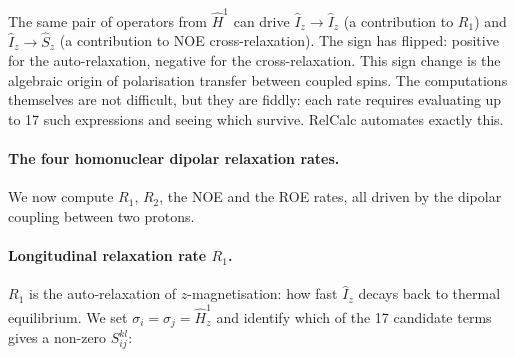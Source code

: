 \documentclass[notitlepage,11pt]{article}
\begin{document}
The same pair of operators from $\hat{H}^1$ can drive $\hat{I}_z\to\hat{I}_z$ (a contribution to $R_1$) and $\hat{I}_z\to\hat{S}_z$ (a contribution to NOE cross-relaxation). The sign has flipped: positive for the auto-relaxation, negative for the cross-relaxation. This sign change is the algebraic origin of polarisation transfer between coupled spins. The computations themselves are not difficult, but they are fiddly: each rate requires evaluating up to 17 such expressions and seeing which survive. RelCalc automates exactly this.

\paragraph{The four homonuclear dipolar relaxation rates.} We now compute $R_1$, $R_2$, the NOE and the ROE rates, all driven by the dipolar coupling between two protons.

\paragraph{Longitudinal relaxation rate $R_1$.} $R_1$ is the auto-relaxation of $z$-magnetisation: how fast $\hat{I}_z$ decays back to thermal equilibrium. We set $\sigma_i=\sigma_j=\hat{H}^1_z$ and identify which of the 17 candidate terms gives a non-zero $S_{ij}^{kl}$:
\end{document}
